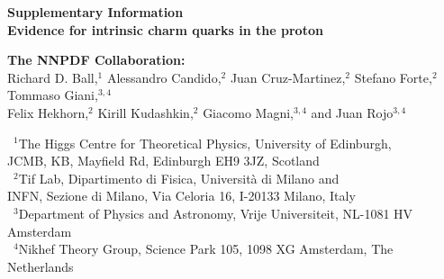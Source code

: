 \appendix

\setcounter{page}{1}




\begin{center}

{\bf \LARGE Supplementary Information }\\[0.8cm]


  {{\LARGE \bf Evidence for intrinsic charm quarks in the proton}}


  
  \vspace{1.1cm}

  {\small
    {\bf  The NNPDF Collaboration:} \\[0.2cm]
     Richard D. Ball,$^{1}$
  Alessandro Candido,$^{2}$
Juan Cruz-Martinez,$^{2}$
Stefano Forte,$^{2}$
Tommaso Giani,$^{3,4}$\\[0.1cm]
Felix Hekhorn,$^{2}$
Kirill Kudashkin,$^{2}$
Giacomo Magni,$^{3,4}$ and
Juan Rojo$^{3,4}$
  }\\



 \vspace{0.7cm}
 
 {\it \small

 ~$^1$The Higgs Centre for Theoretical Physics, University of Edinburgh,\\
   JCMB, KB, Mayfield Rd, Edinburgh EH9 3JZ, Scotland\\[0.1cm]
    ~$^2$Tif Lab, Dipartimento di Fisica, Universit\`a di Milano and\\
   INFN, Sezione di Milano, Via Celoria 16, I-20133 Milano, Italy\\[0.1cm]
    ~$^3$Department of Physics and Astronomy, Vrije Universiteit, NL-1081 HV Amsterdam\\[0.1cm]
~$^4$Nikhef Theory Group, Science Park 105, 1098 XG Amsterdam, The Netherlands\\[0.1cm]
}

 \vspace{1cm}


 


\end{center}

